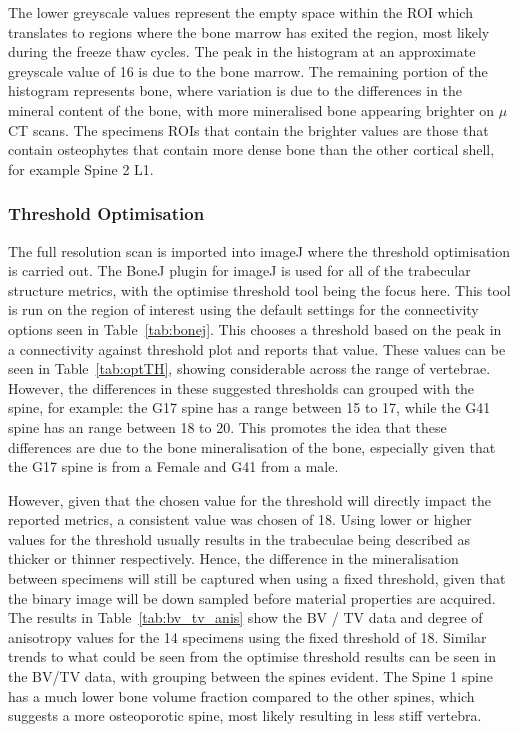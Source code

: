 The lower greyscale values represent the empty space within the ROI which
translates to regions where the bone marrow has exited the region, most likely
during the freeze thaw cycles. The peak in the histogram at an approximate
greyscale value of 16 is due to the bone marrow. The remaining portion of the
histogram represents bone, where variation is due to the differences in the
mineral content of the bone, with more mineralised bone appearing brighter on
$\mu$CT scans. The specimens ROIs that contain the brighter values are those
that contain osteophytes that contain more dense bone than the other cortical
shell, for example Spine 2 L1.

\subsubsection{Threshold Optimisation}\label{th_opt}


The full resolution scan is imported into imageJ where the threshold optimisation is carried out.
The BoneJ plugin for imageJ is used for all of the trabecular structure metrics, with the optimise threshold tool being the focus here.
This tool is run on the region of interest using the default settings for the connectivity options seen in Table~\ref{tab:bonej}.
This chooses a threshold based on the peak in a connectivity against threshold plot and reports that value.
These values can be seen in Table~\ref{tab:optTH}, showing considerable across the range of vertebrae.
However, the differences in these suggested thresholds can grouped with the spine, for example: the G17 spine has a range between 15 to 17, while the G41 spine has an range between 18 to 20.
This promotes the idea that these differences are due to the bone mineralisation of the bone, especially given that the G17 spine is from a Female and G41 from a male.

However, given that the chosen value for the threshold will directly impact the reported metrics, a consistent value was chosen of 18. Using lower or higher values for the threshold usually results in the trabeculae being described as thicker or thinner respectively.
Hence, the difference in the mineralisation between specimens will still be captured when using a fixed threshold, given that the binary image will be down sampled before material properties are acquired.
The results in Table~\ref{tab:bv_tv_anis} show the BV / TV data and degree of anisotropy values for the 14 specimens using the fixed threshold of 18.
Similar trends to what could be seen from the optimise threshold results can be seen in the BV/TV data, with grouping between the
spines evident.
The Spine 1 spine has a much lower bone volume fraction compared to the other spines, which suggests a more osteoporotic spine, most likely resulting in less stiff vertebra.

